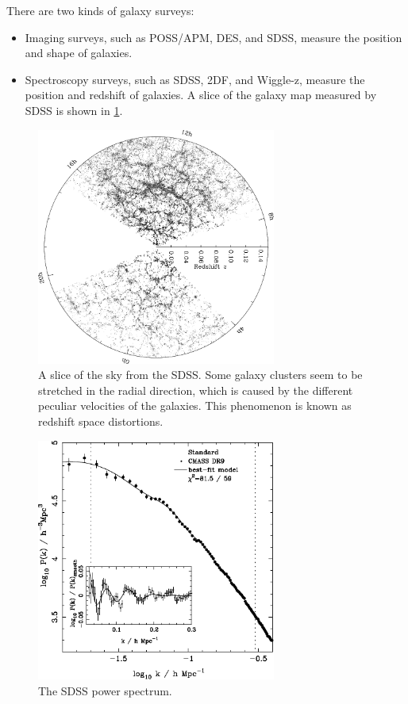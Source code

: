 There are two kinds of galaxy surveys:
\begin{itemize}
	\item Imaging surveys, such as POSS/APM, DES, and SDSS, measure the position and shape of galaxies.
	\item Spectroscopy surveys, such as SDSS, 2DF, and Wiggle-z, measure the position and redshift of galaxies. A slice of the galaxy map measured by SDSS is shown in \cref{fig:spectroscopic-survey}.
\end{itemize}

\begin{figure}
	\centering
	\includegraphics[width=0.7\textwidth]{img/ch-03/sdss.jpeg}
	\caption{A slice of the sky from the SDSS. Some galaxy clusters seem to be stretched in the radial direction, which is caused by the different peculiar velocities of the galaxies. This phenomenon is known as redshift space distortions.}
	\label{fig:spectroscopic-survey}
\end{figure}

\begin{figure}
	\centering
	\includegraphics[width=0.7\textwidth]{img/ch-03/sdss-power-spectrum.pdf}
	\caption{The SDSS power spectrum.}
	\label{fig:sdss-power-spectrum}
\end{figure}

